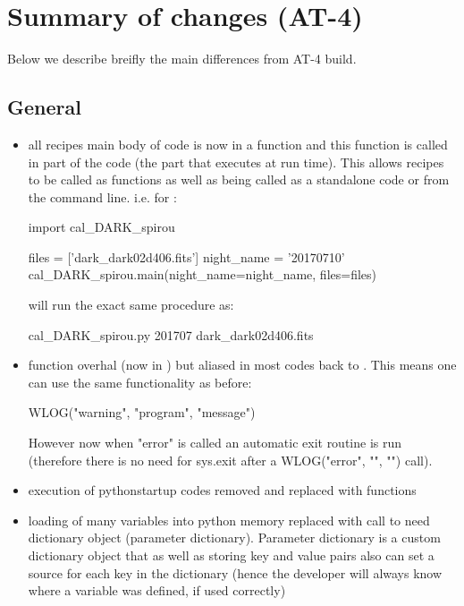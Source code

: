 \chapter{Summary of changes (AT-4)}
\label{ch:changelog}

Below we describe breifly the main differences from AT-4 build.

\section{General}
\begin{itemize}

\item all recipes main body of code is now in a  function and this function is called in  part of the code (the part that executes at run time). This allows recipes to be called as functions as well as being called as a standalone code or from the command line. i.e. for \calDARK:
	\begin{pythonbox}
	import cal_DARK_spirou
	    
	files = ['dark_dark02d406.fits']
	night_name = '20170710'
	cal_DARK_spirou.main(night_name=night_name, files=files)
	\end{pythonbox}
	will run the exact same procedure as:
	\begin{bashbox}
	cal_DARK_spirou.py 201707 dark_dark02d406.fits
	\end{bashbox}

\item {} function overhal (now in ) but aliased in most codes back to . This means one can use the same functionality as before:
	\begin{pythonbox}
	WLOG("warning", "program", "message")
	\end{pythonbox}
	However now when "error" is called an automatic exit routine is run (therefore there is no need for sys.exit after a WLOG("error", "", "") call).

\item execution of pythonstartup codes removed and replaced with functions

\item loading of many variables into python memory replaced with call to need dictionary object (parameter dictionary). Parameter dictionary is a custom dictionary object that as well as storing key and value pairs also can set a source for each key in the dictionary (hence the developer will always know where a variable was defined, if used correctly)


\end{itemize}
